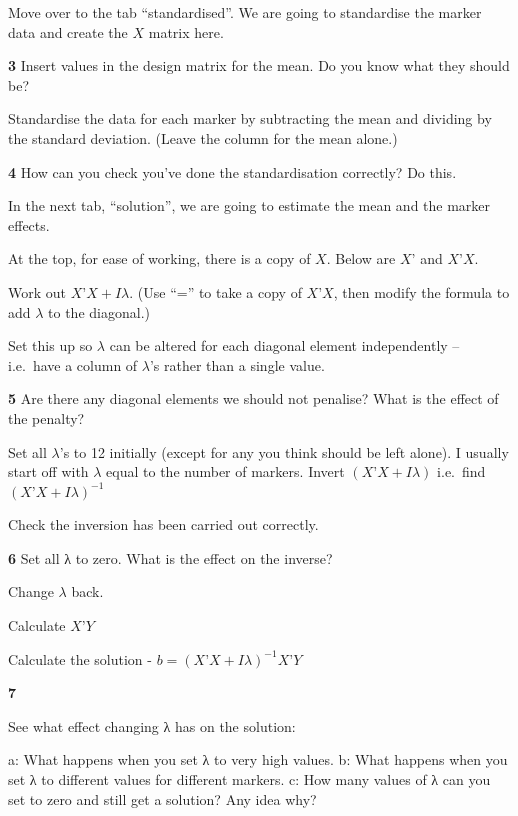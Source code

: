 \documentclass[
]{book}
\makeatletter
\newenvironment{kframe}{%
\medskip{}
\setlength{\fboxsep}{.8em}
 \def\at@end@of@kframe{}%
 \ifinner\ifhmode%
  \def\at@end@of@kframe{\end{minipage}}%
  \begin{minipage}{\columnwidth}%
 \fi\fi%
 \def\FrameCommand##1{\hskip\@totalleftmargin \hskip-\fboxsep
 \colorbox{shadecolor}{##1}\hskip-\fboxsep
     \hskip-\linewidth \hskip-\@totalleftmargin \hskip\columnwidth}%
 \MakeFramed {\advance\hsize-\width
   \@totalleftmargin\z@ \linewidth\hsize
   \@setminipage}}%
 {\par\unskip\endMakeFramed%
 \at@end@of@kframe}
\newenvironment{rmdblock}[1]
  {
  \begin{itemize}
  \renewcommand{\labelitemi}{
    \raisebox{-.7\height}[0pt][0pt]{
      {\setkeys{Gin}{width=3em,keepaspectratio}\texttt{[image: images/\#1]}}
    }
  }
  \setlength{\fboxsep}{1em}
  \begin{kframe}
  \item
  }
  {
  \end{kframe}
  \end{itemize}
  }
\newenvironment{rmdquiz}
  {\begin{rmdblock}{quiz}}
  {\end{rmdblock}}
\makeatother
\begin{document}
Move over to the tab ``standardised''. We are going to standardise the marker data and create the \(X\) matrix here.

\begin{rmdquiz}
\textbf{3}
Insert values in the design matrix for the mean. Do you know what they should be?
\end{rmdquiz}

Standardise the data for each marker by subtracting the mean and dividing by the standard deviation. (Leave the column for the mean alone.)

\begin{rmdquiz}
\textbf{4}
How can you check you've done the standardisation correctly? Do this.
\end{rmdquiz}

In the next tab, ``solution'', we are going to estimate the mean and the marker effects.

At the top, for ease of working, there is a copy of \(X\). Below are \(X’\) and \(X’X\).

Work out \(X’X + Iλ\). (Use ``='' to take a copy of \(X’X\), then modify the formula to add \(λ\) to the diagonal.)

Set this up so \(λ\) can be altered for each diagonal element independently -- i.e.~have a column of \(λ\)'s rather than a single value.

\begin{rmdquiz}
\textbf{5} Are there any diagonal elements we should not penalise? What is the effect of the penalty?
\end{rmdquiz}

Set all \(λ\)'s to 12 initially (except for any you think should be left alone). I usually start off with \(λ\) equal to the number of markers. Invert \((X’X + Iλ)\) i.e.~find \((X’X + Iλ)^{-1}\)

Check the inversion has been carried out correctly.

\begin{rmdquiz}
\textbf{6}
Set all λ to zero. What is the effect on the inverse?
\end{rmdquiz}

Change \(λ\) back.

Calculate \(X’Y\)

Calculate the solution - \(b = (X’X+Iλ)^{-1} X’Y\)

\begin{rmdquiz}
\textbf{7}

See what effect changing λ has on the solution:

a: What happens when you set λ to very high values.
b: What happens when you set λ to different values for different markers.
c: How many values of λ can you set to zero and still get a solution? Any idea why?
\end{rmdquiz}
\end{document}
